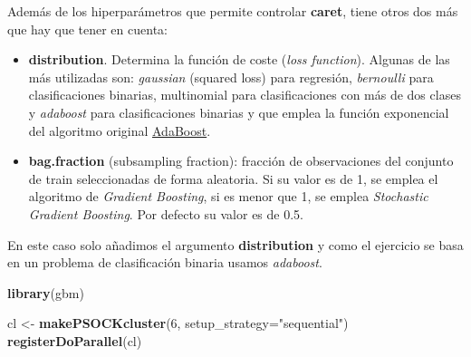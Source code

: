 \documentclass[]{article}
\newenvironment{Shaded}{\begin{snugshade}}{\end{snugshade}}
\newcommand{\DataTypeTok}[1]{\textcolor[rgb]{0.13,0.29,0.53}{#1}}
\newcommand{\DecValTok}[1]{\textcolor[rgb]{0.00,0.00,0.81}{#1}}
\newcommand{\KeywordTok}[1]{\textcolor[rgb]{0.13,0.29,0.53}{\textbf{#1}}}
\newcommand{\NormalTok}[1]{#1}
\newcommand{\StringTok}[1]{\textcolor[rgb]{0.31,0.60,0.02}{#1}}
\begin{document}
Además de los hiperparámetros que permite controlar \textbf{caret},
tiene otros dos más que hay que tener en cuenta:

\begin{itemize}
\item
  \textbf{distribution}. Determina la función de coste (\emph{loss
  function}). Algunas de las más utilizadas son: \emph{gaussian}
  (squared loss) para regresión, \emph{bernoulli} para clasificaciones
  binarias, multinomial para clasificaciones con más de dos clases y
  \emph{adaboost} para clasificaciones binarias y que emplea la función
  exponencial del algoritmo original
  \href{https://en.wikipedia.org/wiki/AdaBoost}{AdaBoost}.
\item
  \textbf{bag.fraction} (subsampling fraction): fracción de
  observaciones del conjunto de train seleccionadas de forma aleatoria.
  Si su valor es de 1, se emplea el algoritmo de \emph{Gradient
  Boosting}, si es menor que 1, se emplea \emph{Stochastic Gradient
  Boosting}. Por defecto su valor es de 0.5.
\end{itemize}

En este caso solo añadimos el argumento \textbf{distribution} y como el
ejercicio se basa en un problema de clasificación binaria usamos
\emph{adaboost}.

\begin{Shaded}
\begin{Highlighting}[]
\KeywordTok{library}\NormalTok{(gbm)}
\end{Highlighting}
\end{Shaded}

\begin{Shaded}
\begin{Highlighting}[]
\NormalTok{cl <-}\StringTok{ }\KeywordTok{makePSOCKcluster}\NormalTok{(}\DecValTok{6}\NormalTok{, }\DataTypeTok{setup_strategy=}\StringTok{"sequential"}\NormalTok{)}
\KeywordTok{registerDoParallel}\NormalTok{(cl)}
\end{Highlighting}
\end{Shaded}
\end{document}
